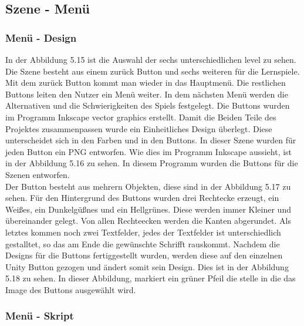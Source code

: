 \subsection{Szene - Menü}

\subsubsection{Menü - Design}

In der Abbildung 5.15 ist die Auswahl der sechs unterschiedlichen level zu sehen. Die Szene besteht aus einem zurück Button und sechs weiteren für die Lernspiele. Mit dem zurück Button kommt man wieder in das Hauptmenü. Die restlichen Buttons leiten den Nutzer ein Menü weiter. In dem nächsten Menü werden die Alternativen und die Schwierigkeiten des Spiels festgelegt. Die Buttons wurden im Programm Inkscape vector graphics erstellt. Damit die Beiden Teile des Projektes zusammenpassen wurde ein Einheitliches Design überlegt. Diese unterscheidet sich in den Farben und in den Buttons. In dieser Szene wurden für jeden Button ein PNG entworfen. Wie dies im Programm Inkscape aussieht, ist in der Abbildung 5.16 zu sehen. In diesem Programm wurden die Buttons für die Szenen entworfen.\\
Der Button besteht aus mehrern Objekten, diese sind in der Abbildung 5.17 zu sehen. Für den Hintergrund des Buttons wurden drei Rechtecke erzeugt, ein Weißes, ein Dunkelgüßnes und ein Hellgrünes. Diese werden immer Kleiner und übereinander gelegt. Von allen Rechteecken werden die Kanten abgerundet. Als letztes kommen noch zwei Textfelder, jedes der Textfelder ist unterschiedlich gestalltet, so das am Ende die gewünschte Schrifft rauskommt. 
Nachdem die Designs für die Buttons fertiggestellt wurden, werden diese auf den einzelnen Unity Button gezogen und ändert somit sein Design. Dies ist in der Abbildung 5.18 zu sehen.
In dieser Abbildung, markiert ein grüner Pfeil die stelle in die das Image des Buttons ausgewählt wird.

\subsubsection{Menü - Skript}

